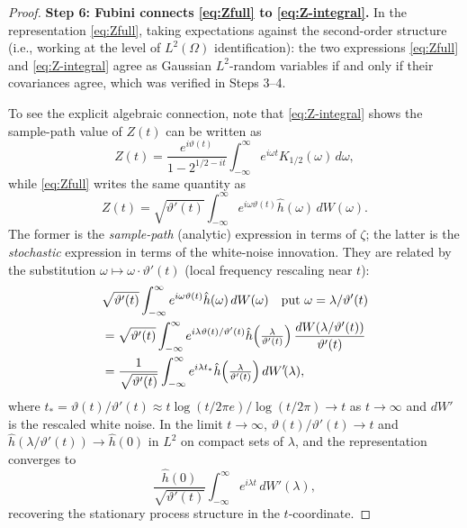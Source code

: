 \documentclass[11pt,a4paper]{article}
\begin{document}
\begin{proof}
\medskip\noindent\textbf{Step 6: Fubini connects \eqref{eq:Zfull} to \eqref{eq:Z-integral}.}
In the representation \eqref{eq:Zfull}, taking expectations against the
second-order structure (i.e., working at the level of $L^2(\Omega)$ identification):
the two expressions \eqref{eq:Zfull} and \eqref{eq:Z-integral} agree as
Gaussian $L^2$-random variables if and only if their covariances agree,
which was verified in Steps 3--4.

To see the explicit algebraic connection, note that \eqref{eq:Z-integral} shows
the sample-path value of $Z(t)$ can be written as
\begin{equation}
  Z(t)
  =\frac{e^{i\vartheta(t)}}{1-2^{1/2-it}}
  \int_{-\infty}^{\infty} e^{i\omega t}K_{1/2}(\omega)\,d\omega,
\end{equation}
while \eqref{eq:Zfull} writes the same quantity as
\begin{equation}
  Z(t)
  =\sqrt{\vartheta'(t)}\int_{-\infty}^{\infty}
    e^{i\omega\vartheta(t)}\hat{h}(\omega)\,dW(\omega).
\end{equation}
The former is the \emph{sample-path} (analytic) expression in terms of
$\zeta$; the latter is the \emph{stochastic} expression in terms of the
white-noise innovation. They are related by the substitution
$\omega\mapsto\omega\cdot\vartheta'(t)$ (local frequency rescaling near $t$):
\begin{align}
  &\sqrt{\vartheta'(t)}\int_{-\infty}^{\infty}
    e^{i\omega\vartheta(t)}\hat{h}(\omega)\,dW(\omega)
  \quad\text{put } \omega=\lambda/\vartheta'(t) \notag\\
  &=\sqrt{\vartheta'(t)}\int_{-\infty}^{\infty}
    e^{i\lambda\vartheta(t)/\vartheta'(t)}\hat{h}\!\left(\tfrac{\lambda}{\vartheta'(t)}\right)
    \frac{dW(\lambda/\vartheta'(t))}{\vartheta'(t)} \notag\\
  &=\frac{1}{\sqrt{\vartheta'(t)}}
    \int_{-\infty}^{\infty}
    e^{i\lambda t_*}
    \hat{h}\!\left(\tfrac{\lambda}{\vartheta'(t)}\right)
    dW'\!(\lambda),
\end{align}
where $t_*=\vartheta(t)/\vartheta'(t)\approx t\log(t/2\pi e)/\log(t/2\pi)\to t$
as $t\to\infty$ and $dW'$ is the rescaled white noise.
In the limit $t\to\infty$, $\vartheta(t)/\vartheta'(t)\to t$ and
$\hat{h}(\lambda/\vartheta'(t))\to\hat{h}(0)$ in $L^2$ on compact sets
of $\lambda$, and the representation converges to
\begin{equation}
  \frac{\hat{h}(0)}{\sqrt{\vartheta'(t)}}
  \int_{-\infty}^{\infty} e^{i\lambda t}\,dW'(\lambda),
\end{equation}
recovering the stationary process structure in the $t$-coordinate.


\end{proof}
\end{document}
